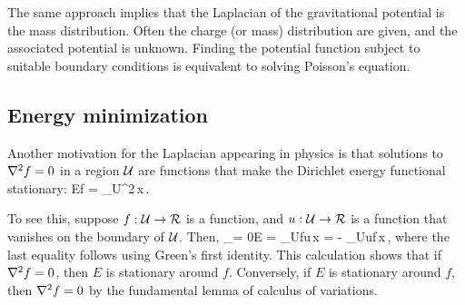 The same approach implies that the Laplacian of the gravitational potential is the mass distribution. Often the charge (or mass) distribution are given, and the associated potential is unknown. Finding the potential function subject to suitable boundary conditions is equivalent to solving Poisson's equation.


\subsection{Energy minimization}
Another motivation for the Laplacian appearing in physics is that solutions to $\nabla^2 f = 0$ in a region $\mathcal{U}$ are functions that make the Dirichlet energy functional stationary:
\beq
E\vat f = \int_{\region U}^2\,\dx x\,.
\eeq

To see this, suppose ${f}:{\mathcal{U}}\to{\mathcal{R}}$ is a function, and ${u}:{\mathcal{U}}\to{\mathcal{R}}$ is a function that vanishes on the boundary of $\mathcal{U}$. Then,
\beq
\xod{}{\epsilon}\Bigl\vert_{\epsilon = 0}E 
    = \int_{\region U}\grad f\iprod\grad u\,\dx x
    = - \int_{\region U}u\lder f\,\dx x\,,
\eeq
where the last equality follows using Green's first identity. This calculation shows that if $\nabla^2 f = 0$, then $E$ is stationary around $f$. Conversely, if $E$ is stationary around $f$, then $\nabla^2 f = 0$ by the fundamental lemma of calculus of variations.
